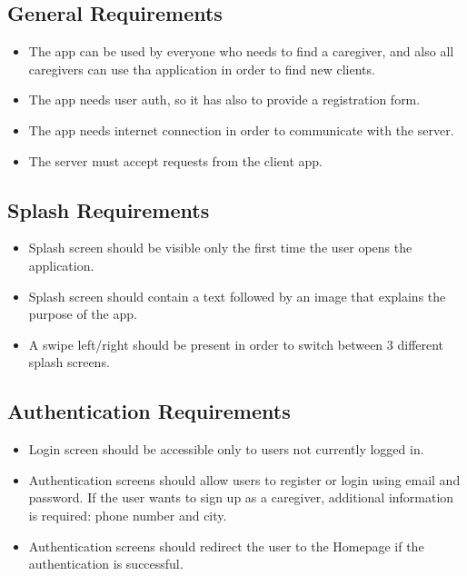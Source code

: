 \documentclass[../../dd.tex]{subfiles}
\begin{document}
    \subsection{General Requirements}
    \begin{itemize}
        \item The app can be used by everyone who needs to find a caregiver, and also all caregivers can use
        tha application in order to find new clients.
        \item The app needs user auth, so it has also to provide a registration form.
        \item The app needs internet connection in order to communicate with the server.
        \item The server must accept requests from the client app.
    \end{itemize}

    \subsection{Splash Requirements}
    \begin{itemize}
        \item Splash screen should be visible only the first time the user opens the application.
        \item Splash screen should contain a text followed by an image that explains the purpose of the app.
        \item A swipe left/right should be present in order to switch between 3 different splash screens.
    \end{itemize}

    \subsection{Authentication Requirements}
    \begin{itemize}
        \item Login screen should be accessible only to users not currently logged in.
        \item Authentication screens should allow users to register or login using
        email and password.
        If the user wants to sign up as a caregiver, additional information is required: phone number and city.
        \item Authentication screens should redirect the user to the Homepage
        if the authentication is successful.
    \end{itemize}
\end{document}
